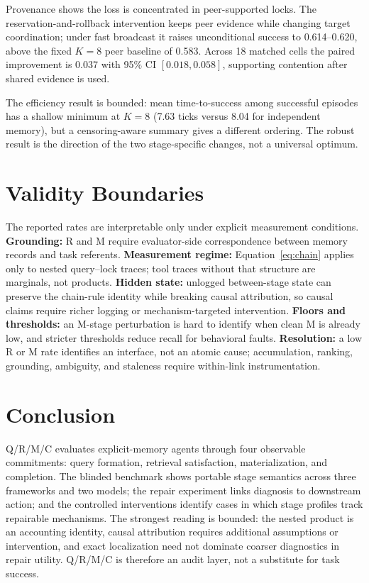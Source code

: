 \documentclass{article}
\newcommand{\qrmc}{Q/R/M/C}
\begin{document}
Provenance shows the loss is concentrated in peer-supported locks. The reservation-and-rollback intervention keeps peer evidence while changing target coordination; under fast broadcast it raises unconditional success to 0.614--0.620, above the fixed $K=8$ peer baseline of 0.583. Across 18 matched cells the paired improvement is 0.037 with 95\% CI $[0.018,0.058]$, supporting contention after shared evidence is used.

The efficiency result is bounded: mean time-to-success among successful episodes has a shallow minimum at $K=8$ (7.63 ticks versus 8.04 for independent memory), but a censoring-aware summary gives a different ordering. The robust result is the direction of the two stage-specific changes, not a universal optimum.

\section{Validity Boundaries}
\label{sec:validity}

The reported rates are interpretable only under explicit measurement conditions. \textbf{Grounding:} R and M require evaluator-side correspondence between memory records and task referents. \textbf{Measurement regime:} Equation~\ref{eq:chain} applies only to nested query--lock traces; tool traces without that structure are marginals, not products. \textbf{Hidden state:} unlogged between-stage state can preserve the chain-rule identity while breaking causal attribution, so causal claims require richer logging or mechanism-targeted intervention. \textbf{Floors and thresholds:} an M-stage perturbation is hard to identify when clean M is already low, and stricter thresholds reduce recall for behavioral faults. \textbf{Resolution:} a low R or M rate identifies an interface, not an atomic cause; accumulation, ranking, grounding, ambiguity, and staleness require within-link instrumentation.

\section{Conclusion}

\qrmc{} evaluates explicit-memory agents through four observable commitments: query formation, retrieval satisfaction, materialization, and completion. The blinded benchmark shows portable stage semantics across three frameworks and two models; the repair experiment links diagnosis to downstream action; and the controlled interventions identify cases in which stage profiles track repairable mechanisms. The strongest reading is bounded: the nested product is an accounting identity, causal attribution requires additional assumptions or intervention, and exact localization need not dominate coarser diagnostics in repair utility. \qrmc{} is therefore an audit layer, not a substitute for task success.
\end{document}
